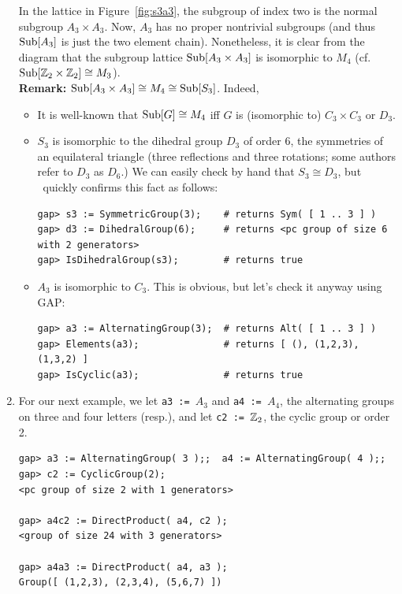 \begin{enumerate}
In the lattice in Figure~\ref{fig:s3a3}, the
subgroup of index two is the normal subgroup $A_3 \times A_3$. 
Now, $A_3$ has no proper nontrivial subgroups (and thus $\mathrm{Sub}[A_3]$ is just the
two element chain).  Nonetheless, it is clear from the diagram that the subgroup
lattice $\mathrm{Sub}[A_3 \times A_3]$ is isomorphic to $M_4$ (cf.~$\mathrm{Sub}[\mathbb{Z}_2 \times \mathbb{Z}_2]
\cong M_3$).
\\[6pt]
{\bf Remark:} $\mathrm{Sub}[A_3 \times A_3] \cong M_4 \cong \mathrm{Sub}[S_3]$.  Indeed,
\begin{itemize}
\item It is well-known that $\mathrm{Sub}[G]\cong M_4$ iff $G$ is (isomorphic to) $C_3\times C_3$ or $D_3$.
\item  $S_3$ is isomorphic to the dihedral group $D_3$ of order 6, the symmetries of
  an equilateral triangle (three reflections and three rotations; some authors refer
  to $D_3$ as $D_6$.)  We can easily check by hand that $S_3 \cong D_3$, but \gap\
  quickly confirms this fact as follows:
{\codesize
\begin{verbatim}
gap> s3 := SymmetricGroup(3);    # returns Sym( [ 1 .. 3 ] )
gap> d3 := DihedralGroup(6);     # returns <pc group of size 6 with 2 generators>
gap> IsDihedralGroup(s3);        # returns true
\end{verbatim}}
\item $A_3$ is isomorphic to $C_3$.  This is obvious, but let's check it anyway using GAP:
{\codesize
\begin{verbatim}
gap> a3 := AlternatingGroup(3);  # returns Alt( [ 1 .. 3 ] )
gap> Elements(a3);               # returns [ (), (1,2,3), (1,3,2) ]
gap> IsCyclic(a3);               # returns true

\end{verbatim}}
\end{itemize}

\item For our next example, we let {\tt a3 := $A_3$} and {\tt a4 := $A_4$}, the
alternating groups on three and four letters (resp.), and let 
{\tt c2 := $\mathbb{Z}_2$}, the cyclic group or order 2. 
{\codesize
\begin{verbatim}
gap> a3 := AlternatingGroup( 3 );;  a4 := AlternatingGroup( 4 );;
gap> c2 := CyclicGroup(2);
<pc group of size 2 with 1 generators>

gap> a4c2 := DirectProduct( a4, c2 );
<group of size 24 with 3 generators>

gap> a4a3 := DirectProduct( a4, a3 );
Group([ (1,2,3), (2,3,4), (5,6,7) ])


\end{verbatim}}
\end{enumerate}
